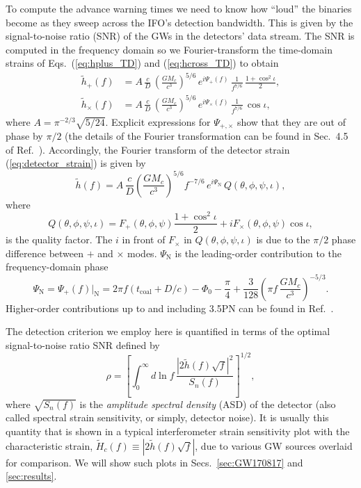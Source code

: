 \documentclass[prd,amsmath,amssymb,aps,floats,amsfonts,notitlepage,superscriptaddress,eqsecnum,nofootinbib,10pt]{revtex4-1}
\newcommand{\f}{\frac}
\newcommand{\be}{\begin{equation}}
\newcommand{\ee}{\end{equation}}
\begin{document}
To compute the advance warning times we need to know how ``loud'' the binaries become as they sweep across the IFO's detection bandwidth.
This is given by the signal-to-noise ratio (SNR) of the GWs in the detectors' data stream.
The SNR is computed in the frequency domain so we Fourier-transform the time-domain strains of Eqs.~(\ref{eq:hplus_TD}) and (\ref{eq:hcross_TD}) to obtain
%
\begin{align}
 \tilde{h}_+(f) &= A \, \f{c}{D}\, \left(\f{G M_c}{c^3}\right)^{5/6}\, e^{i \Psi_+(f)}\, \f{1}{f^{7/6}}\,  \f{1+\cos^2\iota}{2}  ,\label{eq:hplus_FD}\\
 \tilde{h}_\times(f) & = A \, \f{c}{D}\, \left(\f{G M_c}{c^3}\right)^{5/6}\, e^{i \Psi_\times(f)}\, \f{1}{f^{7/6}}\, \cos\iota \label{eq:hcross_FD},
\end{align}
%
%
where $A= \pi^{-2/3} \sqrt{5/24}$.
Explicit expressions for $\Psi_{+,\times}$ show that they are out of phase by $\pi/2$
(the details of the Fourier transformation can be found in Sec.~4.5 of Ref.~\cite{Maggiore}).
Accordingly, the Fourier transform of the detector strain (\ref{eq:detector_strain}) is given by
%
\be
\tilde{h}(f) = A\, \f{c}{D}\left(\f{G M_c}{c^3}\right)^{5/6} f^{-7/6}\, e^{i\Psi_\text{N}}\, Q(\theta,\phi,\psi,\iota), \label{eq:strain_FD}
\ee
%
where 
%
\be
Q(\theta,\phi,\psi,\iota) = F_+(\theta,\phi,\psi)\f{1+\cos^2\iota}{2}  + i F_\times(\theta,\phi,\psi) \cos\iota \label{eq:Q},
\ee
%
is the quality factor.
The $i$ in front of $F_\times$ in $Q(\theta,\phi,\psi,\iota)$ is due to the $\pi/2$ phase difference between $+$ and $\times$ modes.
$\Psi_\text{N}$ is the leading-order contribution to the frequency-domain phase
%
\be
\Psi_\text{N}=\Psi_+(f)|_\text{N} = 2\pi f (t_\text{coal}+D/c)-\Phi_0-\f{\pi}{4}+ \f{3}{128}\left(\pi f\,\f{G M_c}{c^3}\right)^{-5/3} \label{eq:phase_FD}.
\ee
%
%
Higher-order contributions up to and including 3.5PN can be found in Ref.~\cite{SchutzLRR}.

The detection criterion we employ here is quantified in terms of the optimal signal-to-noise ratio SNR defined by
%
\be
\rho=\left[ \int_0^\infty d\ln f\, \f{|2\tilde{h}(f)\sqrt{f}|^2}{S_n(f)}\right]^{1/2} \label{eq:SNR},
\ee
%
where $\sqrt{S_n(f)}$ is the {\it amplitude spectral density} (ASD) of the detector (also called spectral strain sensitivity, or simply, detector noise).
It is usually this quantity that is shown in a typical interferometer strain sensitivity plot with the characteristic strain, $\tilde{H}_c(f)\equiv|2\tilde{h}(f)\sqrt{f}|$, 
due to various GW sources overlaid for comparison. 
%
We will show such plots in Secs.~\ref{sec:GW170817} and \ref{sec:results}.
\end{document}
